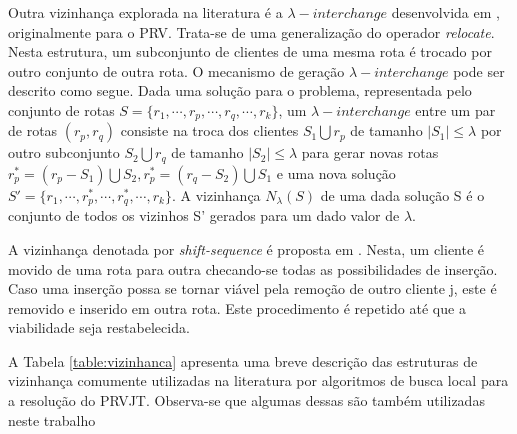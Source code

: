 Outra vizinhança explorada na literatura é a \(\lambda-interchange\) desenvolvida em \cite{Osman}, originalmente para o PRV. Trata-se de uma generalização do operador \textit{relocate}. Nesta estrutura, um subconjunto de clientes de uma mesma rota é trocado por outro conjunto de outra rota. O mecanismo de geração \(\lambda-interchange\) pode ser descrito como segue. Dada uma solução para o problema, representada pelo conjunto de rotas \(S = \{r_1, \cdots,r_p, \cdots,r_q,\cdots,r_k\}\), um \(\lambda-interchange\) entre um par de rotas \((r_p, r_q)\) consiste na troca dos clientes \(S_1\bigcup r_p\) de tamanho \(|S_1|\leq\lambda\) por outro subconjunto \(S_2\bigcup r_q\) de tamanho \(|S_2|\leq\lambda\) para gerar novas rotas \(r^\ast_p = (r_p-S_1)\bigcup S_2, r^\ast_p = (r_q - S_2) \bigcup S_1 \) e uma nova solução  \(S' = \{r_1, \cdots,r^\ast_p, \cdots,r^\ast_q,\cdots,r_k\}\).
A vizinhança \(N_\lambda(S)\) de uma dada solução S é o conjunto de todos os vizinhos S' gerados para um dado valor de \(\lambda\).

A vizinhança denotada por \textit{shift-sequence} é proposta em \cite{Schulze}.  Nesta, um cliente é movido de uma rota para outra checando-se todas as possibilidades de inserção. Caso uma inserção possa se tornar viável pela remoção de outro cliente j, este é removido e inserido em outra rota. Este procedimento é repetido até que a viabilidade seja restabelecida.

A Tabela \ref{table:vizinhanca} apresenta uma breve descrição das estruturas de vizinhança comumente
utilizadas na literatura por algoritmos de busca local para a resolução do PRVJT. Observa-se
que algumas dessas são também utilizadas neste trabalho

